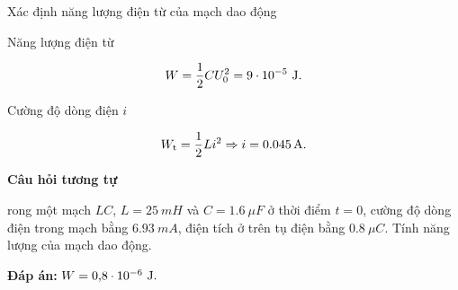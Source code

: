 \begin{dang}{Xác định năng lượng điện từ của mạch dao động}
{	Năng lượng điện từ
	
	$$W = \dfrac{1}{2}CU_0^2 = 9 \cdot 10^{-5}\ \text J.$$
	
	Cường độ dòng điện $i$
	
	$$ W_\text t =\dfrac{1}{2} Li^2 \Rightarrow i = \SI{0,045}{A}.$$
	
		\begin{center}
		\textbf{Câu hỏi tương tự}
	\end{center}
	
	rong một mạch $LC$, $L = \SI{25}{mH}$ và $C = \SI{1,6}{\mu F}$ ở thời điểm $t = 0$, cường độ dòng điện trong mạch bằng $\SI{6,93}{mA}$, điện tích ở trên tụ điện bằng $\SI{0,8}{\mu C}$. Tính năng lượng của mạch dao động.
	
	\textbf{Đáp án:} $W = \text{0,8}\cdot 10^{-6}\ \text J.$
}

\end{dang}
